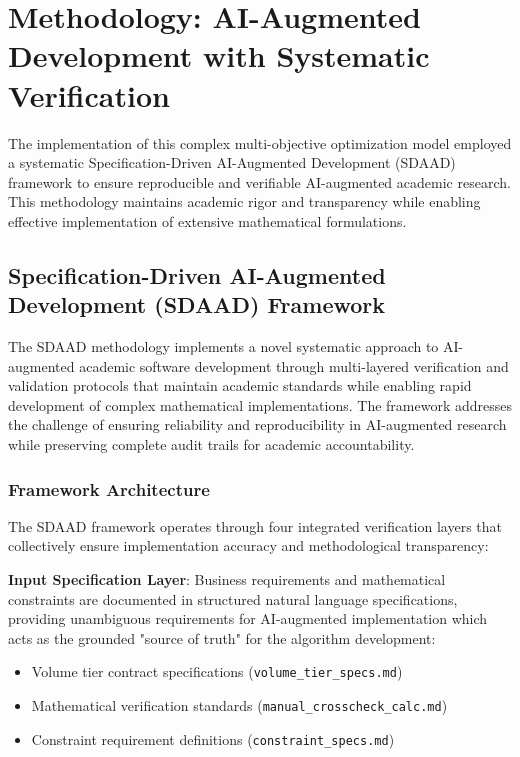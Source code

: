 \section{Methodology: AI-Augmented Development with Systematic Verification}\label{sec:sdaad}

The implementation of this complex multi-objective optimization model employed a systematic Specification-Driven AI-Augmented Development (SDAAD) framework to ensure reproducible and verifiable AI-augmented academic research. This methodology maintains academic rigor and transparency while enabling effective implementation of extensive mathematical formulations.

\subsection{Specification-Driven AI-Augmented Development (SDAAD) Framework}

The SDAAD methodology implements a novel systematic approach to AI-augmented academic software  development through multi-layered verification and validation protocols that maintain academic standards while enabling rapid development of complex mathematical implementations. The framework addresses the challenge of ensuring reliability and reproducibility in AI-augmented research while preserving complete audit trails for academic accountability.

\subsubsection{Framework Architecture}

The SDAAD framework operates through four integrated verification layers that collectively ensure implementation accuracy and methodological transparency:

\textbf{Input Specification Layer}: Business requirements and mathematical constraints are documented in structured natural language specifications, providing unambiguous requirements for AI-augmented implementation which acts as the grounded "source of truth" for the algorithm development:
\begin{itemize}
    \item Volume tier contract specifications (\texttt{volume\_tier\_specs.md})
    \item Mathematical verification standards (\texttt{manual\_crosscheck\_calc.md})
    \item Constraint requirement definitions (\texttt{constraint\_specs.md})
\end{itemize}

